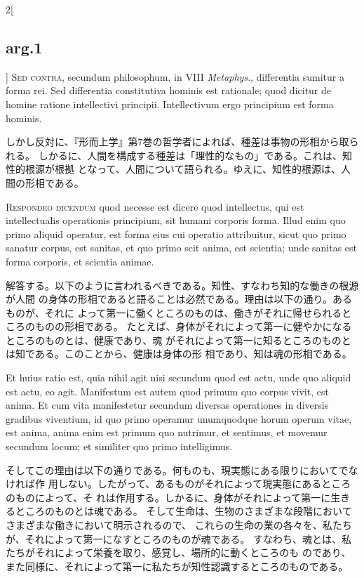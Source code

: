 \documentclass[paper=a4paper,fontsize=10pt,jafontsize=9pt,titlepage]{jlreq}
\begin{document}
\begin{paracol}{2}[\subsection{arg.1}]
 {\scshape Sed contra}, secundum philosophum, in VIII {\itshape Metaphys}.,
 differentia sumitur a forma rei. Sed differentia constitutiva hominis est
 rationale; quod dicitur de homine ratione intellectivi principii. Intellectivum
 ergo principium est forma hominis.
 
\switchcolumn

 しかし反対に、『形而上学』第7巻の哲学者によれば、種差は事物の形相から取られる。
 しかるに、人間を構成する種差は「理性的なもの」である。これは、知性的根源が根拠
 となって、人間について語られる。ゆえに、知性的根源は、人間の形相である。
 

 {\scshape Respondeo dicendum} quod necesse est dicere quod intellectus, qui est
 intellectualis operationis principium, sit humani corporis forma. Illud enim
 quo primo aliquid operatur, est forma eius cui operatio attribuitur, sicut quo
 primo sanatur corpus, est sanitas, et quo primo scit anima, est scientia; unde
 sanitas est forma corporis, et scientia animae.

 
\switchcolumn

 解答する。以下のように言われるべきである。知性、すなわち知的な働きの根源が人間
 の身体の形相であると語ることは必然である。理由は以下の通り。あるものが、それに
 よって第一に働くところのものは、働きがそれに帰せられるところのものの形相である。
 たとえば、身体がそれによって第一に健やかになるところのものとは、健康であり、魂
 がそれによって第一に知るところのものとは知である。このことから、健康は身体の形
 相であり、知は魂の形相である。
 
\switchcolumn*


 Et huius ratio est, quia nihil agit nisi secundum quod est actu, unde quo
 aliquid est actu, eo agit. Manifestum est autem quod primum quo corpus vivit,
 est anima. Et cum vita manifestetur secundum diversas operationes in diversis
 gradibus viventium, id quo primo operamur unumquodque horum operum vitae, est
 anima, anima enim est primum quo nutrimur, et sentimus, et movemur secundum
 locum; et similiter quo primo intelligimus.
 
\switchcolumn

そしてこの理由は以下の通りである。何ものも、現実態にある限りにおいてでなければ作
用しない。したがって、あるものがそれによって現実態にあるところのものによって、そ
れは作用する。しかるに、身体がそれによって第一に生きるところのものとは魂である。
そして生命は、生物のさまざまな段階においてさまざまな働きにおいて明示されるので、
これらの生命の業の各々を、私たちが、それによって第一になすところのものが魂である。
すなわち、魂とは、私たちがそれによって栄養を取り、感覚し、場所的に動くところのも
のであり、また同様に、それによって第一に私たちが知性認識するところのものである。
 

\end{paracol}
\end{document}
